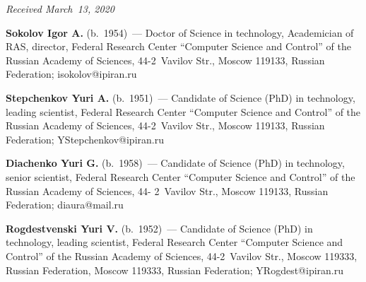   \hfill{\small\textit{Received March~13, 2020}}



\vspace*{-18pt}
  
  
  \Contr
  
  \vspace*{-2pt}
  
  \noindent
  \textbf{Sokolov Igor A.} (b.\ 1954)~--- Doctor of Science in technology, Academician of RAS, 
  director, Federal Research Center ``Computer Science and Control'' of the 
Russian Academy of Sciences, 44-2~Vavilov Str., Moscow 119133, Russian Federation; 
\mbox{isokolov@ipiran.ru}
  
  \vspace*{3pt}
  
  \noindent
  \textbf{Stepchenkov Yuri A.} (b.\ 1951)~--- Candidate of Science (PhD) in technology, leading 
scientist, Federal Research Center ``Computer Science and Control'' of the Russian Academy of 
Sciences, 44-2~Vavilov Str., Moscow 119133, Russian Federation; \mbox{YStepchenkov@ipiran.ru}
  
  \vspace*{3pt}
  
  \noindent
  \textbf{Diachenko Yuri G.} (b.\ 1958)~--- Candidate of Science (PhD) in technology, senior scientist, 
Federal Research Center ``Computer Science and Control'' of the Russian Academy of Sciences, 44-
2~Vavilov Str., Moscow 119133, Russian Federation; \mbox{diaura@mail.ru}
  
  \vspace*{3pt}
  
  \noindent
  \textbf{Rogdestvenski Yuri V.} (b.\ 1952)~--- Candidate of Science (PhD) in technology, leading 
scientist, Federal Research Center ``Computer Science and Control'' of the Russian Academy of 
Sciences, 44-2~Vavilov Str., Moscow 119333, Russian Federation, Moscow 119333, Russian 
Federation; \mbox{YRogdest@ipiran.ru}
\label{end\stat}

\renewcommand{\bibname}{\protect\rm Литература} 
  
  